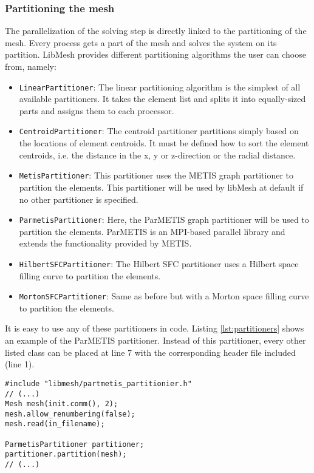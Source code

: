   \subsubsection{Partitioning the mesh}\label{sec:Impl-Parallel-Partitioning}
   The parallelization of the solving step is directly linked to the partitioning of the mesh. Every process gets a part of the mesh and solves the system on its partition. LibMesh provides different partitioning algorithms the user can choose from, namely:
   \begin{itemize}
   	\item \texttt{LinearPartitioner}: The linear partitioning algorithm is the simplest of all available partitioners. It takes the element list and splits it into equally-sized parts and assigns them to each processor.
   	\item \texttt{CentroidPartitioner}: The centroid partitioner partitions simply based on the locations of element centroids. It must be defined how to sort the element centroids, i.e. the distance in the x, y or z-direction or the radial distance.
   	\item \texttt{MetisPartitioner}: This partitioner uses the METIS graph partitioner to partition the elements. This partitioner will be used by libMesh at default if no other partitioner is specified.
   	\item \texttt{ParmetisPartitioner}: Here, the ParMETIS graph partitioner will be used to partition the elements. ParMETIS is an MPI-based parallel library and extends the functionality provided by METIS.
   	\item \texttt{HilbertSFCPartitioner}: The Hilbert SFC partitioner uses a Hilbert space filling curve to partition the elements.
   	\item \texttt{MortonSFCPartitioner}: Same as before but with a Morton space filling curve to partition the elements.
   \end{itemize}
   It is easy to use any of these partitioners in code. Listing \ref{lst:partitioners} shows an example of the ParMETIS partitioner. Instead of this partitioner, every other listed class can be placed at line 7 with the corresponding header file included (line 1).
\begin{lstlisting}[caption=Mesh partitioning example,label=lst:partitioners,keepspaces=true]
#include "libmesh/partmetis_partitionier.h"
// (...)
Mesh mesh(init.comm(), 2);
mesh.allow_renumbering(false);
mesh.read(in_filename);	

ParmetisPartitioner partitioner;
partitioner.partition(mesh);
// (...)
\end{lstlisting}
  
